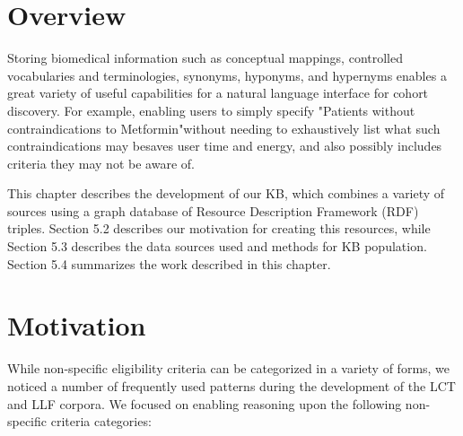 \documentclass[../main.tex]{subfiles}
\begin{document}


\section{Overview}

Storing biomedical information such as conceptual mappings, controlled vocabularies and terminologies, synonyms, hyponyms, and hypernyms enables a great variety of useful capabilities for a natural language interface for cohort discovery. For example, enabling users to simply specify "Patients without contraindications to Metformin"\textemdash without needing to exhaustively list what such contraindications may be\textemdash saves user time and energy, and also possibly includes criteria they may not be aware of.  

This chapter describes the development of our KB, which combines a variety of sources using a graph database of Resource Description Framework (RDF) \cite{manola2004rdf} triples. Section 5.2 describes our motivation for creating this resources, while Section 5.3 describes the data sources used and methods for KB population. Section 5.4 summarizes the work described in this chapter.

\section{Motivation}

While non-specific eligibility criteria can be categorized in a variety of forms, we noticed a number of frequently used patterns during the development of the LCT and LLF corpora. We focused on enabling reasoning upon the following non-specific criteria categories:
\end{document}
